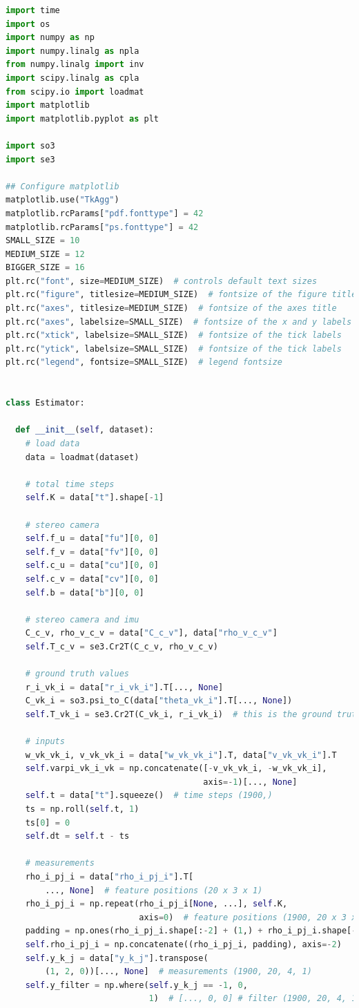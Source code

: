 \documentclass[a4paper]{article}
\begin{document}
\begin{lstlisting}[language=Python, basicstyle=\small, caption=main.py]
import time
import os
import numpy as np
import numpy.linalg as npla
from numpy.linalg import inv
import scipy.linalg as cpla
from scipy.io import loadmat
import matplotlib
import matplotlib.pyplot as plt

import so3
import se3

## Configure matplotlib
matplotlib.use("TkAgg")
matplotlib.rcParams["pdf.fonttype"] = 42
matplotlib.rcParams["ps.fonttype"] = 42
SMALL_SIZE = 10
MEDIUM_SIZE = 12
BIGGER_SIZE = 16
plt.rc("font", size=MEDIUM_SIZE)  # controls default text sizes
plt.rc("figure", titlesize=MEDIUM_SIZE)  # fontsize of the figure title
plt.rc("axes", titlesize=MEDIUM_SIZE)  # fontsize of the axes title
plt.rc("axes", labelsize=SMALL_SIZE)  # fontsize of the x and y labels
plt.rc("xtick", labelsize=SMALL_SIZE)  # fontsize of the tick labels
plt.rc("ytick", labelsize=SMALL_SIZE)  # fontsize of the tick labels
plt.rc("legend", fontsize=SMALL_SIZE)  # legend fontsize


class Estimator:

  def __init__(self, dataset):
    # load data
    data = loadmat(dataset)

    # total time steps
    self.K = data["t"].shape[-1]

    # stereo camera
    self.f_u = data["fu"][0, 0]
    self.f_v = data["fv"][0, 0]
    self.c_u = data["cu"][0, 0]
    self.c_v = data["cv"][0, 0]
    self.b = data["b"][0, 0]

    # stereo camera and imu
    C_c_v, rho_v_c_v = data["C_c_v"], data["rho_v_c_v"]
    self.T_c_v = se3.Cr2T(C_c_v, rho_v_c_v)

    # ground truth values
    r_i_vk_i = data["r_i_vk_i"].T[..., None]
    C_vk_i = so3.psi_to_C(data["theta_vk_i"].T[..., None])
    self.T_vk_i = se3.Cr2T(C_vk_i, r_i_vk_i)  # this is the ground truth

    # inputs
    w_vk_vk_i, v_vk_vk_i = data["w_vk_vk_i"].T, data["v_vk_vk_i"].T
    self.varpi_vk_i_vk = np.concatenate([-v_vk_vk_i, -w_vk_vk_i],
                                        axis=-1)[..., None]
    self.t = data["t"].squeeze()  # time steps (1900,)
    ts = np.roll(self.t, 1)
    ts[0] = 0
    self.dt = self.t - ts

    # measurements
    rho_i_pj_i = data["rho_i_pj_i"].T[
        ..., None]  # feature positions (20 x 3 x 1)
    rho_i_pj_i = np.repeat(rho_i_pj_i[None, ...], self.K,
                           axis=0)  # feature positions (1900, 20 x 3 x 1)
    padding = np.ones(rho_i_pj_i.shape[:-2] + (1,) + rho_i_pj_i.shape[-1:])
    self.rho_i_pj_i = np.concatenate((rho_i_pj_i, padding), axis=-2)
    self.y_k_j = data["y_k_j"].transpose(
        (1, 2, 0))[..., None]  # measurements (1900, 20, 4, 1)
    self.y_filter = np.where(self.y_k_j == -1, 0,
                             1)  # [..., 0, 0] # filter (1900, 20, 4, 1)


\end{lstlisting}
\end{document}
